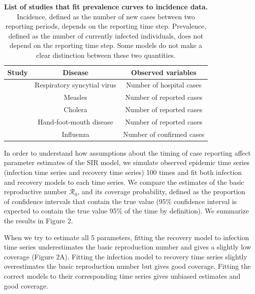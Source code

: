 \documentclass{article}\usepackage[]{graphicx}\usepackage[]{color}
\begin{document}
\begin{table}
\centering
\begin{tabular}{l | c | c}
\hline
\textbf{Study} & \textbf{Disease} &  \textbf{Observed variables}\\
\hline
\cite{capistran2009parameter} & Respiratory syncytial virus & Number of hospital cases\\
\cite{hooker2010parameterizing} & Measles & Number of reported cases\\
\cite{eisenberg2013identifiability} & Cholera & Number of reported cases\\
\cite{yang2013stability} & Hand-foot-mouth disease & Number of reported cases\\
\cite{gonzalez2014fractional} & Influenza & Number of confirmed cases\\
\hline
\end{tabular}
\caption{
\textbf{List of studies that fit prevalence curves to incidence data.}
Incidence, defined as the number of new cases between two reporting periods, depends
on the reporting time step.
Prevalence, defined as the number of currently infected individuals, does not depend
on the reporting time step.
Some models do not make a clear distinction between these two quantities.
}
\end{table}

In order to understand how assumptions about the timing of case reporting affect 
parameter estimates of the SIR model, we simulate observed epidemic time series
(infection time series and recovery time series) 
100 times and fit both infection and recovery models to each 
time series. We compare the estimates of the basic reproductive number $\mathcal R_0$,
and its coverage probability, defined as the proportion of confidence intervals that
contain the true value (95\% confidence interval is expected to contain the true value
95\% of the time by definition). We summarize the results in Figure 2.

When we try to estimate all 5 parameters, fitting the recovery model to
infection time series underestimates the basic reproduction number and 
gives a slightly low coverage (Figure 2A). Fitting the infection model to recovery
time series slightly overestimates the basic reproduction number but gives 
good coverage. Fitting the correct models to their corresponding time series
gives unbiased estimates and good coverage.
\end{document}
